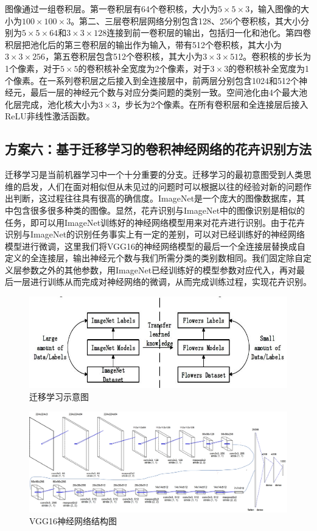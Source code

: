 \documentclass[supercite]{HustGraduPaper}
\begin{document}
\begin{sloppypar}
  图像通过一组卷积层。第一卷积层有64个卷积核，大小为$5\times5\times3$，输入图像的大小为$100\times100\times3$。第二、三层卷积层网络分别包含128、256个卷积核，其大小分别为$5\times5\times64$和$3\times3\times128$连接到前一卷积层的输出，包括归一化和池化。第四卷积层把池化后的第三卷积层的输出作为输入，带有512个卷积核，其大小为$3\times3\times256$，第五卷积层包含512个卷积核，其大小为$3\times3\times512$。卷积核的步长为1个像素，对于$5\times5$的卷积核补全宽度为2个像素，对于$3\times3$的卷积核补全宽度为1个像素。在一系列卷积层之后接入到全连接层中，前两层分别包含1024和512个神经元，最后一层的神经元个数与对应分类问题的类别一致。空间池化由4个最大池化层完成，池化核大小为$3\times3$，步长为2个像素。在所有卷积层和全连接层后接入ReLU非线性激活函数。
  \subsection{方案六：基于迁移学习的卷积神经网络的花卉识别方法}
  迁移学习是当前机器学习中一个十分重要的分支。迁移学习的最初意图受到人类思维的启发，人们在面对相似但从未见过的问题时可以根据以往的经验对新的问题作出判断，这过程往往具有很高的确信度。ImageNet是一个庞大的图像数据库，其中包含很多很多种类的图像。显然，花卉识别与ImageNet中的图像识别是相似的任务，即可以用ImageNet训练好的神经网络模型用来对花卉进行识别。由于花卉识别与ImageNet的识别任务事实上有一定的差别，可以对已经训练好的神经网络模型进行微调，这里我们将VGG16的神经网络模型的最后一个全连接层替换成自定义的全连接层，输出神经元个数与我们所需分类的类别数相同。我们固定除自定义层参数之外的其他参数，用ImageNet已经训练好的模型参数对应代入，再对最后一层进行训练从而完成对神经网络的微调，从而完成训练过程，实现花卉识别。\begin{figure}[H]
    \setlength{\abovecaptionskip}{0.2cm}
    \setlength{\belowcaptionskip}{-0.cm}
      \centering%
      \includegraphics[scale=0.6]{29.jpg}
      \caption{迁移学习示意图}
    \end{figure}\begin{figure}[H]
      \setlength{\abovecaptionskip}{0.2cm}
      \setlength{\belowcaptionskip}{-0.cm}
        \centering%
        \includegraphics[scale=0.3]{14.jpg}
        \caption{VGG16神经网络结构图}
    \end{figure}

\end{sloppypar}
\end{document}
